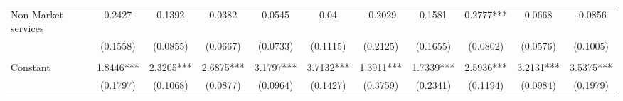 \begin{table}[htbp]
{\begin{tabular}{lcccccccccc}
\hspace{1em}Non Market services & 0.2427 & 0.1392 & 0.0382 & 0.0545 & 0.04 & -0.2029 & 0.1581 & 0.2777*** & 0.0668 & -0.0856 \\
& (0.1558) & (0.0855) & (0.0667) & (0.0733) & (0.1115) & (0.2125) & (0.1655) & (0.0802) & (0.0576) & (0.1005) \\ 
\text{} &&&&&&&&&&\\
Constant & 1.8446*** & 2.3205*** & 2.6875*** & 3.1797*** & 3.7132*** & 1.3911*** & 1.7339*** & 2.5936*** & 3.2131*** & 3.5375*** \\
& (0.1797) & (0.1068) & (0.0877) & (0.0964) & (0.1427) & (0.3759) & (0.2341) & (0.1194) & (0.0984) & (0.1979) \\ 
\bottomrule
\end{tabular}
}
\end{table}